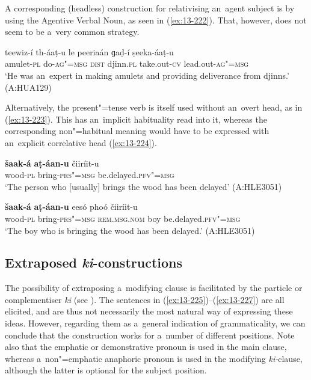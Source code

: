 A corresponding (headless) construction for relativising an~agent subject is by using the Agentive Verbal Noun, as seen in (\ref{ex:13-222}). That, however, does not seem to be a~very common strategy. 

\begin{exe}
\ex
\label{ex:13-222}
\gll teewiz-í th-áaṭ-u le peeriaán ɡaḍ-í  ṣeeka-áaṭ-u \\
amulet-\textsc{pl} do-\textsc{ag"=msg} \textsc{dist} djinn.\textsc{pl} take.out-\textsc{cv} lead.out-\textsc{ag"=msg} \\
\glt `He was an~expert in making amulets and providing deliverance from djinns.' (A:HUA129) 
\end{exe}

Alternatively, the present"=tense verb is itself used without an~overt head, as in (\ref{ex:13-223}). This has an~implicit habituality read into it, whereas the corresponding non"=habitual meaning would have to be expressed with an~explicit correlative head (\ref{ex:13-224}).

\begin{exe}
\ex
\label{ex:13-223}
\gll \textbf{šaak-á} \textbf{aṭ-áan-u} čiiríit-u  \\
wood-\textsc{pl} bring-\textsc{prs"=msg} be.delayed.\textsc{pfv"=msg} \\
\glt `The person who [usually] brings the wood has been delayed' (A:HLE3051)

\ex
\label{ex:13-224}
\gll \textbf{šaak-á} \textbf{aṭ-áan-u} eesó phoó čiiríit-u  \\
wood-\textsc{pl} bring-\textsc{prs"=msg} \textsc{rem.ms}\textsc{g.}\textsc{nom} boy be.delayed.\textsc{pfv"=msg}  \\
\glt `The boy who is bringing the wood has been delayed.' (A:HLE3051)
\end{exe}

\subsection{Extraposed \textit{ki}-constructions}
\label{subsec:13-6-7}

The possibility of extraposing a~modifying clause is facilitated by the particle or complementiser \textit{ki} (see ). The sentences in (\ref{ex:13-225})--(\ref{ex:13-227}) are all elicited, and are thus not necessarily the most natural way of expressing these ideas. However, regarding them as a~general indication of grammaticality, we can conclude that the construction works for a~number of different positions. Note also that the emphatic or demonstrative pronoun is used in the main clause, whereas a~non"=emphatic anaphoric pronoun is used in the modifying \textit{ki-}clause, although the latter is optional for the subject position.

